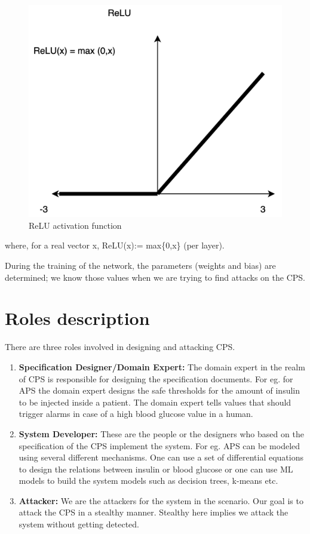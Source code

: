 \begin{figure}
	\centering
	\includegraphics[width=0.7\linewidth]{Images/ReLU}
	\caption[Activation functions]{ReLU activation function}
	\label{fig:ReLU}
\end{figure}
where, for a real vector x, ReLU(x):= max\{0,x\} (per layer).

During the training of the network, the parameters (weights and bias) are determined; we know those values when we are trying to find attacks on the CPS.


\section{Roles description}
There are three roles involved in designing and attacking \ac{CPS}.

\begin{enumerate}
	\item \textbf{Specification Designer/Domain Expert:} The domain expert in the realm of \ac{CPS} is responsible for designing the specification documents. For eg. for \ac{APS} the domain expert designs the safe thresholds for the amount of insulin to be injected inside a patient. The domain expert tells values that should trigger alarms in case of a high blood glucose value in a human. 
	
	\item \textbf{System Developer:} These are the people or the designers who based on the specification of the CPS implement the system. For eg. \ac{APS} can be modeled using several different mechanisms. One can use a set of differential equations to design the relations between insulin or blood glucose or one can use \ac{ML} models to build the system models such as decision trees, k-means etc. 
	
	\item \textbf{Attacker:} We are the attackers for the system in the scenario. Our goal is to attack the \ac{CPS} in a stealthy manner. Stealthy here implies we attack the system without getting detected. 
\end{enumerate}



